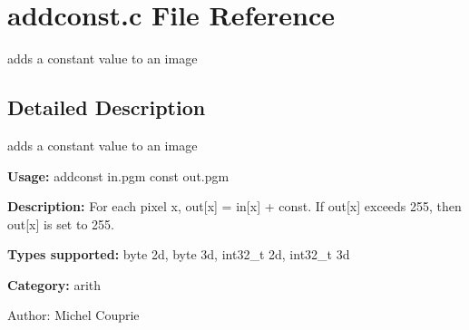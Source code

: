 \section{addconst.c File Reference}
\label{addconst_8c}
adds a constant value to an image 



\subsection{Detailed Description}
adds a constant value to an image 

{\bf Usage:} addconst in.pgm const out.pgm

{\bf Description:} For each pixel x, out[x] = in[x] + const. If out[x] exceeds 255, then out[x] is set to 255.

{\bf Types supported:} byte 2d, byte 3d, int32\_\-t 2d, int32\_\-t 3d

{\bf Category:} arith

\begin{Desc}
\item[Author:]Michel Couprie \end{Desc}
